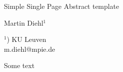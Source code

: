 \documentclass[a4paper]{article}
\begin{document}

\Large
 \begin{center}
Simple Single Page Abstract template\\ 

\hspace{10pt}

\large
Martin Diehl$^1$\\

\hspace{10pt}

\small  
$^1$) KU Leuven\\
m.diehl@mpie.de

\end{center}

\hspace{10pt}

\normalsize

Some text
\cite{Diehl2017}

\printbibliography 
\end{document}
